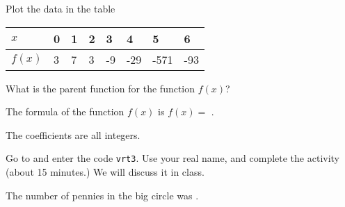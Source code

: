 \documentclass{ximera}
\begin{document}
\begin{question}
Plot the data in the table
\begin{center}
\begin{tabular}{llllllll}
    $x$  & 0 & 1 & 2 & 3  & 4   & 5    & 6   \\ \hline
    $f(x)$ & 3 & 7 & 3 & -9 & -29 & -571 & -93 \\
\end{tabular}
\end{center} 
What is the parent function for the function $f(x)$?
\begin{solution}
\begin{multiple-choice}
\end{multiple-choice}
The formula of the function $f(x)$ is $f(x)=$ .
\begin{hint}
The coefficients are all integers.
\end{hint}
\end{solution}

\end{question}




\begin{question}
Go to  and enter the code \verb|vrt3|. Use your real name, and complete the activity (about 15 minutes.) We will discuss it in class.
\begin{solution}
The number of pennies in the big circle was .
\end{solution}
\end{question}
\end{document}

